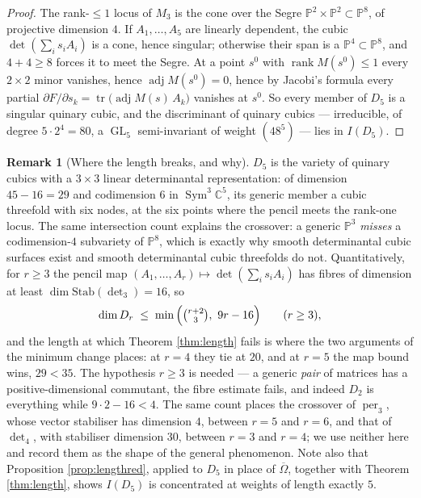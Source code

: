 \documentclass[11pt,reqno]{amsart}
\theoremstyle{plain}
\theoremstyle{definition}
\newtheorem{remark}[theorem]{Remark}
\DeclareMathOperator{\GL}{GL}
\DeclareMathOperator{\Sym}{Sym}
\DeclareMathOperator{\tr}{tr}
\DeclareMathOperator{\per}{per}
\newcommand{\cO}{\overline{\Omega}}
\newcommand{\bC}{\mathbb{C}}
\begin{document}
\begin{proof}
The rank-$\le1$ locus of $M_3$ is the cone over the Segre
$\mathbb{P}^{2}\times\mathbb{P}^{2}\subset\mathbb{P}^{8}$, of projective dimension $4$.  If
$A_1,\dots,A_5$ are linearly dependent, the cubic $\det(\sum_is_iA_i)$ is a
cone, hence singular; otherwise their span is a $\mathbb{P}^{4}\subset\mathbb{P}^{8}$, and
$4+4\ge8$ forces it to meet the Segre.  At a point $s^{0}$ with
$\operatorname{rank}M(s^{0})\le1$ every $2\times2$ minor vanishes, hence
$\operatorname{adj}M(s^{0})=0$, hence by Jacobi's formula every partial
$\partial F/\partial s_k=\tr\big(\operatorname{adj}M(s)\,A_k\big)$ vanishes at
$s^{0}$.  So every member of $D_5$ is a singular quinary cubic, and the
discriminant of quinary cubics --- irreducible, of degree $5\cdot2^{4}=80$, a
$\GL_5$ semi-invariant of weight $(48^{5})$ --- lies in $I(D_5)$.
\end{proof}

\begin{remark}[Where the length breaks, and why]\label{rem:crossover}
$D_5$ is the variety of quinary cubics with a $3\times3$ linear determinantal
representation: of dimension $45-16=29$ and codimension $6$ in
$\Sym^{3}\bC^{5}$, its generic member a cubic threefold with six nodes, at the
six points where the pencil meets the rank-one locus.  The same intersection
count explains the crossover: a generic $\mathbb{P}^{3}$ \emph{misses} a
codimension-$4$ subvariety of $\mathbb{P}^{8}$, which is exactly why smooth
determinantal cubic surfaces exist and smooth determinantal cubic threefolds
do not.  Quantitatively, for $r\ge3$ the pencil map
$(A_1,\dots,A_r)\mapsto\det(\sum_is_iA_i)$ has fibres of dimension at least
$\dim\mathrm{Stab}(\det_3)=16$, so
\[
  \dim D_r\;\le\;\min\Big(\tbinom{r+2}{3},\ 9r-16\Big)\qquad(r\ge3),
\]
and the length at which Theorem \ref{thm:length} fails is where the two
arguments of the minimum change places: at $r=4$ they tie at $20$, and at
$r=5$ the map bound wins, $29<35$.  The hypothesis $r\ge3$ is needed --- a
generic \emph{pair} of matrices has a positive-dimensional commutant, the
fibre estimate fails, and indeed $D_2$ is everything while $9\cdot2-16<4$.
The same count places the crossover of $\per_3$, whose vector stabiliser has
dimension $4$, between $r=5$ and $r=6$, and that of $\det_4$, with stabiliser
dimension $30$, between $r=3$ and $r=4$; we use neither here and record them
as the shape of the general phenomenon.  Note also that Proposition
\ref{prop:lengthred}, applied to $D_5$ in place of $\cO$, together with
Theorem \ref{thm:length}, shows $I(D_5)$ is concentrated at weights of length
exactly $5$.
\end{remark}
\end{document}

